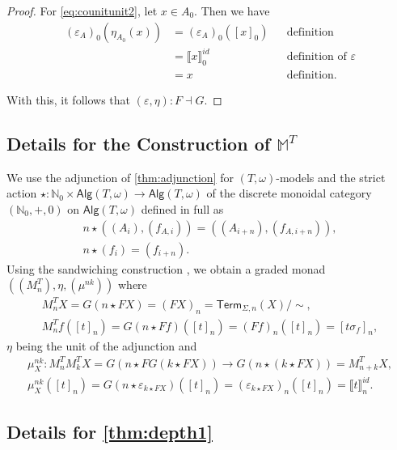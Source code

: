 \documentclass[a4paper,UKenglish,cleveref,thm-restate,numberwithinsect,final]{lipics-v2021}
\newcommand{\Alg}{\mathsf{Alg}}
\newcommand{\Term}{\mathsf{Term}}
\newcommand{\sig}{\Sigma}
\theoremstyle{plain}
\newcommand{\id}{\mathit{id}}
\numberwithin{equation}{section}
\newcommand{\Nat}{{\mathbb{N}}}
\newcommand{\monad}{{\mathbb{M}}}
\newcommand{\+}[1]{\mathcal{#1}\xspace}
\theoremstyle{definition}
\begin{document}
\begin{proof}
    For \eqref{eq:counitunit2}, let \(x \in A_0\).
    Then we have
    \begin{align*}
        (\varepsilon_A)_0(\eta_{A_0}(x))
        &= (\varepsilon_A)_0([x]_0) && \text{definition} \\
        &= \llbracket x \rrbracket^{\id}_0 && \text{definition of } \varepsilon \\
        &= x && \text{definition}.
    \end{align*}

    With this, it follows that \((\varepsilon, \eta)\colon F \dashv G\).
\end{proof}

\subsection{Details for the Construction of $\monad^T$}\label{def:inducedmonad}

We use the adjunction of \cref{thm:adjunction} for
$(T,\omega)$-models and the strict action
\(\star\colon \Nat_0 \times \Alg(T, \omega) \to \Alg(T, \omega)\) of
the discrete monoidal category \((\Nat_0, +, 0)\) on
\(\Alg(T, \omega)\) defined in full as
\begin{gather*}
  n \star ((A_i), (f_{A, i})) = ((A_{i + n}), (f_{A, i + n})), \\
  n \star (f_i) = (f_{i + n}).
\end{gather*}
Using the sandwiching construction {\cite[Section 3]{FujiiEA16}}, we
obtain a graded monad \(((M^T_n), \eta, (\mu^{nk}))\) where
\begin{gather*}
  M^T_nX = G(n \star FX) = (FX)_n = \Term_{\sig, n}(X)/{\sim}, \\
  M_n^Tf([t]_n) = G(n \star Ff)([t]_n) = (Ff)_n([t]_n) = [t\sigma_f]_n,
\end{gather*}
\(\eta\) being the unit of the adjunction and
\begin{gather*}
  \mu^{nk}_X\colon M_n^TM_k^TX = G(n \star FG(k \star FX)) \to G(n \star (k \star FX)) = M^T_{n + k}X, \\
  \mu^{nk}_X([t]_n) = G(n \star \varepsilon_{k \star FX})([t]_n) = (\varepsilon_{k \star FX})_n([t]_n) = \llbracket t \rrbracket^{\id}_n.
\end{gather*}

\subsection*{Details for \cref{thm:depth1}}
\end{document}
